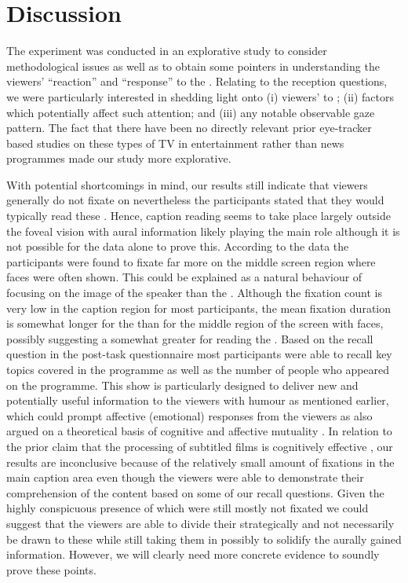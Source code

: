 \documentclass[output=paper]{langsci/langscibook}
\begin{document}
\section{Discussion}

The  experiment was conducted in an explorative study to consider methodological issues as well as to obtain some pointers in understanding the viewers' ``reaction'' and ``response'' to the . Relating to the reception questions, we were particularly interested in shedding light onto (i) viewers'  to ; (ii) factors which potentially affect such attention; and (iii) any notable observable gaze pattern. The fact that there have been no directly relevant prior eye-tracker based studies on these types of TV  in entertainment rather than news programmes made our study more explorative. 


\largerpage
With potential shortcomings in mind, our results still indicate that viewers generally do not fixate on  nevertheless the participants stated that they would typically read these .  Hence, caption reading seems to take place largely outside the foveal vision with aural information likely playing the main role although it is not possible for the  data alone to prove this. According to the  data the participants were found to fixate far more on the middle screen region where faces were often shown. This could be explained as a natural behaviour of focusing on the image of the speaker than the . Although the fixation count is very low in the caption region for most participants, the mean fixation duration is somewhat longer for the  than for the middle region of the screen with faces, possibly suggesting a somewhat greater  for reading the . Based on the recall question in the post-task questionnaire most participants were able to recall key topics covered in the programme as well as the number of people who appeared on the programme. This show is particularly designed to deliver new and potentially useful information to the viewers with humour as mentioned earlier, which could prompt affective (emotional) responses from the viewers as also argued on a theoretical basis of cognitive and affective mutuality \citep{Shiota2003, Sasamoto2014}. In relation to the prior claim that the processing of subtitled films is cognitively effective \citep{perego2010}, our results are inconclusive because of the relatively small amount of fixations in the main caption area even though the viewers were able to demonstrate their comprehension of the content based on some of our recall questions.  Given the highly conspicuous presence of  which were still mostly not fixated we could suggest that the viewers are able to divide their  strategically and not necessarily be drawn to these  while still taking them in possibly to solidify the aurally gained information.  However, we will clearly need more concrete evidence to soundly prove these points. 
\end{document}
